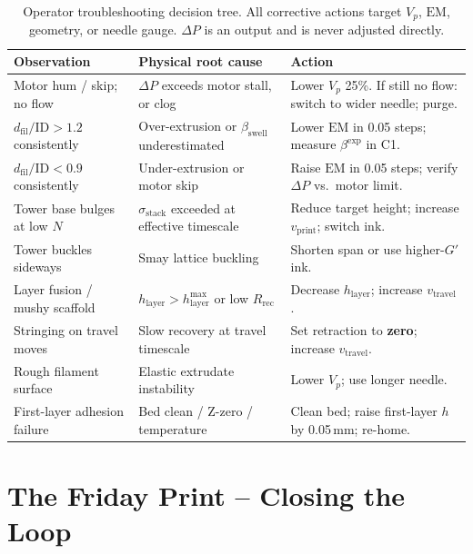 \documentclass[11pt,a4paper]{article}
\begin{document}
\begin{table}[h]
\centering\small
\begin{tabular}{p{3.5cm} p{3.5cm} p{6.0cm}}
\toprule
\textbf{Observation} & \textbf{Physical root cause} & \textbf{Action} \\
\midrule
Motor hum / skip; no flow &
  $\Delta P$ exceeds motor stall, or clog &
  Lower $V_p$ 25\%. If still no flow: switch to wider needle; purge. \\
$d_\mathrm{fil}/\mathrm{ID}>1.2$ consistently &
  Over-extrusion or $\beta_\mathrm{swell}$ underestimated &
  Lower $\mathrm{EM}$ in 0.05 steps; measure $\beta^\mathrm{exp}$ in C1. \\
$d_\mathrm{fil}/\mathrm{ID}<0.9$ consistently &
  Under-extrusion or motor skip &
  Raise $\mathrm{EM}$ in 0.05 steps; verify $\Delta P$ vs.\ motor limit. \\
Tower base bulges at low $N$ &
  $\sigma_\mathrm{stack}$ exceeded at effective timescale &
  Reduce target height; increase $v_\mathrm{print}$; switch ink. \\
Tower buckles sideways &
  Smay lattice buckling &
  Shorten span or use higher-$G'$ ink. \\
Layer fusion / mushy scaffold &
  $h_\mathrm{layer}>h_\mathrm{layer}^{\max}$ or low $R_\mathrm{rec}$ &
  Decrease $h_\mathrm{layer}$; increase $v_\mathrm{travel}$. \\
Stringing on travel moves &
  Slow recovery at travel timescale &
  Set retraction to \textbf{zero}; increase $v_\mathrm{travel}$. \\
Rough filament surface &
  Elastic extrudate instability &
  Lower $V_p$; use longer needle. \\
First-layer adhesion failure &
  Bed clean / Z-zero / temperature &
  Clean bed; raise first-layer $h$ by 0.05\,\si{\mm}; re-home. \\
\bottomrule
\end{tabular}
\caption{Operator troubleshooting decision tree. All corrective actions
target $V_p$, $\mathrm{EM}$, geometry, or needle gauge. $\Delta P$
is an output and is never adjusted directly.}
\label{tab:troubleshoot}
\end{table}

\section{The Friday Print -- Closing the Loop}
\label{sec:friday}
\end{document}
